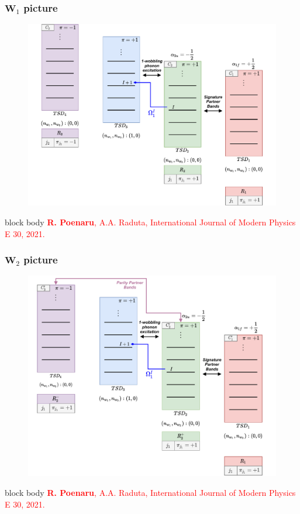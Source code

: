 \documentclass{beamer}
\begin{document}
\begin{frame}
	\frametitle{$\mathbf{W}_1$ picture}
	\vspace{-0.2cm}
	\begin{figure}
		\centering
		\includegraphics[scale=0.42]{figures/W1_Approach.pdf}
	\end{figure}
	\begin{beamercolorbox}[rounded=true,shadow=false, wd=\linewidth,]{block body}
		\centering
		\textcolor{red}{\footnotesize{\textbf{R. Poenaru}, A.A. Raduta, International Journal of Modern Physics E 30, 2021.}}
	\end{beamercolorbox}
\end{frame}

\begin{frame}
	\frametitle{$\mathbf{W}_2$ picture}
	\vspace{-0.2cm}
	\begin{figure}
		\centering
		\includegraphics[scale=0.42]{figures/W2_Approach.pdf}
	\end{figure}
	\begin{beamercolorbox}[rounded=true,shadow=false, wd=\linewidth,]{block body}
		\centering
		\textcolor{red}{\footnotesize{\textbf{R. Poenaru}, A.A. Raduta, International Journal of Modern Physics E 30, 2021.}}
	\end{beamercolorbox}
\end{frame}
\end{document}
